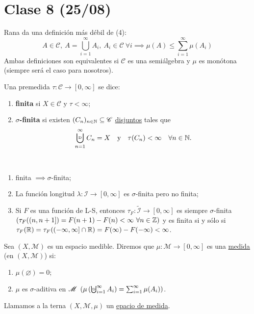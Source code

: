 \section{Clase 8 (25/08)}

\begin{remark}
	Rana da una definición más débil de (4):
	\[ A \in \mathscr{C},\ A = \bigcup_{i=1}^{\infty} A_i,\ A_i \in \mathscr{C}\ \forall i \implies \mu(A) \leq \sum_{i=1}^{\infty}\mu(A_i) \]
	\noindent Ambas definiciones son equivalentes si $\mathscr{C}$ es una semiálgebra y $\mu$ es monótona (siempre será el caso para nosotros).
\end{remark}

\begin{definition}
	Una premedida $\tau : \mathscr{C} \to [0,\infty]$ se dice:
	\begin{enumerate}
		\item \textbf{finita} si $X \in \mathscr{C}$ y $\tau < \infty$;

		\item \textbf{$\sigma$-finita} si existen $(C_n)_{n\in\mathbb{N}} \subseteq \mathscr{C}$ \underline{disjuntos} tales que 
		\[ \bigcupd_{n=1}^{\infty} C_n = X \quad \text{y} \quad \tau (C_n) < \infty\quad \forall n \in \N. \]
	\end{enumerate}
\end{definition}
\bigskip
\begin{eg}~
	\begin{enumerate}
		\item finita $\implies \sigma$-finita;

		\item La función longitud $\lambda : \mathcal{I} \to [0,\infty]$ es $\sigma$-finita pero no finita;

		\item Si $F$ es una función de L-S, entonces $\tau_F : \widetilde{\mathcal{I}} \to [0,\infty]$ es siempre $\sigma$-finita $(\tau_F ((n,n+1]) = F(n+1) - F(n) < \infty\ \forall n \in \mathbb{Z})$ y es finita si y sólo si $\tau_F (\mathbb{R}) = \tau_F ((-\infty,\infty]\cap\mathbb{R}) = F(\infty)-F(-\infty) < \infty$.
	\end{enumerate}
\end{eg}

\begin{definition}[medida]
	Sea $(X,\mathscr{M})$ es un espacio medible. Diremos que $\mu : \mathscr{M} \to [0,\infty]$ es una \underline{medida} (en $(X,\mathscr{M})$) si:
	\begin{enumerate}
		\item $\mu (\varnothing) = 0$;
		
		\item $\mu$ es $\sigma$-aditiva en $\mathscr{M}\ \left( \mu \left(\textbigcupd_{i=1}^{\infty} A_i \right) = \sum_{i=1}^{\infty} \mu(A_i) \right)$.
	\end{enumerate}
	\noindent Llamamos a la terna $(X,\mathscr{M},\mu)$ un \underline{epacio de medida}.
\end{definition}

